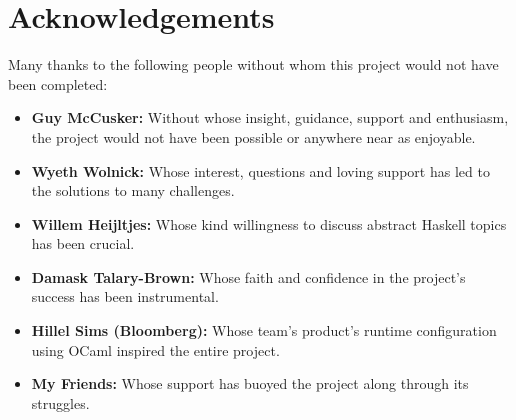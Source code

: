 \chapter*{Acknowledgements} %
\label{cha:acknowledgements}
Many thanks to the following people without whom this project would not have been completed:
\begin{itemize}
    \item \textbf{Guy McCusker:} Without whose insight, guidance, support and enthusiasm, the project would not have been possible or anywhere near as enjoyable.
    \item \textbf{Wyeth Wolnick:} Whose interest, questions and loving support has led to the solutions to many challenges.
    \item \textbf{Willem Heijltjes:} Whose kind willingness to discuss abstract Haskell topics has been crucial.
    \item \textbf{Damask Talary-Brown:} Whose faith and confidence in the project's success has been instrumental. 
    \item \textbf{Hillel Sims (Bloomberg):} Whose team's product's runtime configuration using OCaml inspired the entire project.
    \item \textbf{My Friends:} Whose support has buoyed the project along through its struggles. 
\end{itemize}

